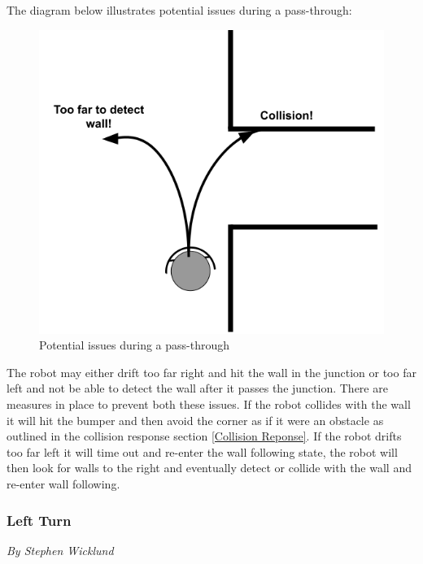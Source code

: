 \documentclass[12pt]{report}
\newcommand{\sectionAuthor}[1]{{\small\vspace{-1em}\textit{#1}}\bigskip\par}
\begin{document}
The diagram below illustrates potential issues during a pass-through:
\begin{figure}[H]
    \centering
    \includegraphics[scale=0.5]{images/Pass Through Issues.png}
    \caption{Potential issues during a pass-through}
    \label{Pass through issues}
\end{figure}

The robot may either drift too far right and hit the wall in the junction or too far left and not be able to detect the wall after it passes the junction. There are measures in place to prevent both these issues. If the robot collides with the wall it will hit the bumper and then avoid the corner as if it were an obstacle as outlined in the collision response section \ref{Collision Reponse}. If the robot drifts too far left it will time out and re-enter the wall following state, the robot will then look for walls to the right and eventually detect or collide with the wall and re-enter wall following.

\subsubsection{Left Turn}
\sectionAuthor{By Stephen Wicklund}
\end{document}
